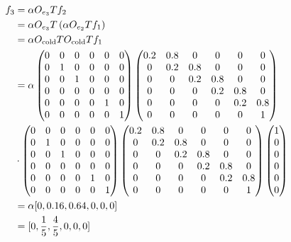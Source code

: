 \documentclass[12pt]{article}
\begin{document}
\begin{align*}
    f_3 &= \alpha O_{e_3} T f_2 \\
    &= \alpha O_{e_3} T \left (\alpha O_{e_2} T f_1 \right) \\
    &= \alpha O_{\text{cold}} T  O_{\text{cold}} T f_1 \\
    &= \alpha 
    \begin{pmatrix}
        0 & 0 & 0 & 0 & 0 & 0 \\
        0 & 1 & 0 & 0 & 0 & 0 \\
        0 & 0 & 1 & 0 & 0 & 0 \\
        0 & 0 & 0 & 0 & 0 & 0 \\
        0 & 0 & 0 & 0 & 1 & 0 \\
        0 & 0 & 0 & 0 & 0 & 1 \\
    \end{pmatrix}
    \begin{pmatrix}
        0.2 & 0.8 & 0 & 0 & 0 & 0 \\
        0 & 0.2 & 0.8 & 0 & 0 & 0 \\
        0 & 0 & 0.2 & 0.8 & 0 & 0 \\
        0 & 0 & 0 & 0.2 & 0.8 & 0 \\
        0 & 0 & 0 & 0 & 0.2 & 0.8 \\
        0 & 0 & 0 & 0 & 0 & 1 \\
    \end{pmatrix} \\
    & \cdot
    \begin{pmatrix}
        0 & 0 & 0 & 0 & 0 & 0 \\
        0 & 1 & 0 & 0 & 0 & 0 \\
        0 & 0 & 1 & 0 & 0 & 0 \\
        0 & 0 & 0 & 0 & 0 & 0 \\
        0 & 0 & 0 & 0 & 1 & 0 \\
        0 & 0 & 0 & 0 & 0 & 1 \\
    \end{pmatrix}
    \begin{pmatrix}
        0.2 & 0.8 & 0 & 0 & 0 & 0 \\
        0 & 0.2 & 0.8 & 0 & 0 & 0 \\
        0 & 0 & 0.2 & 0.8 & 0 & 0 \\
        0 & 0 & 0 & 0.2 & 0.8 & 0 \\
        0 & 0 & 0 & 0 & 0.2 & 0.8 \\
        0 & 0 & 0 & 0 & 0 & 1 \\
    \end{pmatrix}
    \begin{pmatrix}
        1 \\
        0 \\
        0 \\
        0 \\
        0 \\
        0 \\
    \end{pmatrix} \\
    &= \alpha [0, 0.16, 0.64, 0, 0, 0] \\
    &= [0, \frac{1}{5}, \frac{4}{5}, 0, 0, 0] \\
\end{align*}
\end{document}

